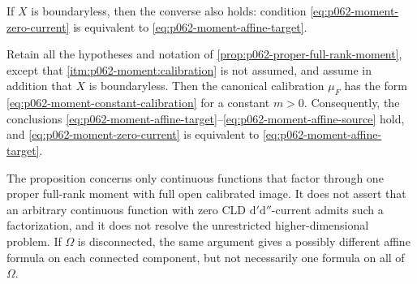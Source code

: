 \begin{proposition}
If $X$ is boundaryless, then the converse also holds: condition
\eqref{eq:p062-moment-zero-current} is equivalent to
\eqref{eq:p062-moment-affine-target}.
\end{proposition}

\begin{corollary}
\label{cor:p062-proper-full-rank-moment-automatic-calibration}
Retain all the hypotheses and notation of
\cref{prop:p062-proper-full-rank-moment}, except that
\cref{itm:p062-moment:calibration} is not assumed, and assume in addition
that $X$ is boundaryless.  Then the canonical
calibration $\mu_F$ has the form
\eqref{eq:p062-moment-constant-calibration} for a constant $m>0$.
Consequently, the conclusions
\eqref{eq:p062-moment-affine-target}--\eqref{eq:p062-moment-affine-source}
hold, and \eqref{eq:p062-moment-zero-current} is equivalent to
\eqref{eq:p062-moment-affine-target}.
\end{corollary}

\begin{remark}
\label{rem:p062-proper-full-rank-moment-scope}
The proposition concerns only continuous functions that factor through one
proper full-rank moment with full open calibrated image.  It does not assert
that an arbitrary continuous function with zero CLD
$\mathrm d'\mathrm d''$-current admits such a factorization, and it does not
resolve the unrestricted higher-dimensional problem.  If $\Omega$ is
disconnected, the same argument gives a possibly different affine formula
on each connected component, but not necessarily one formula on all of
$\Omega$.
\end{remark}
